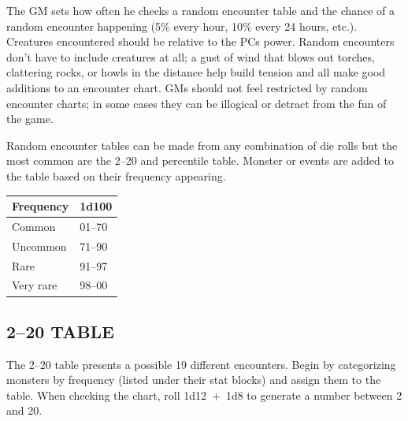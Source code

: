 \begin{multicols}{2}
The GM sets how often he checks a random encounter table and the chance of a random encounter happening (5\% every hour, 10\% every 24 hours, etc.).  Creatures encountered should be relative to the PCs power.  Random encounters don't have to include creatures at all; a gust of wind that blows out torches, clattering rocks, or howls in the distance help build tension and all make good additions to an encounter chart.  GMs should not feel restricted by random encounter charts; in some cases they can be illogical or detract from the fun of the game.  

Random encounter tables can be made from any combination of die rolls but the most common are the 2--20 and percentile table.  Monster or events are added to the table based on their frequency appearing.  

\noindent
\begin{minipage}{\columnwidth}

\label{encounterfreq}
\noindent
\begin{tabular}{|p{}|p{}|}
\hline
Frequency	& 1d100 \\
\hline\hline
\rowcolor[gray]{.9}Common		& 01--70 \\
Uncommon	& 71--90 \\
\rowcolor[gray]{.9}Rare		& 91--97 \\
Very rare	& 98--00 \\
\hline
\end{tabular}

\end{minipage}

\subsection{2--20 TABLE}

The 2--20 table presents a possible 19 different encounters.  Begin by categorizing monsters by frequency (listed under their stat blocks) and assign them to the table.  When checking the chart, roll 1d12~+~1d8 to generate a number between 2 and 20. 

\noindent
\begin{minipage}{\columnwidth}


\end{minipage}
\end{multicols}
